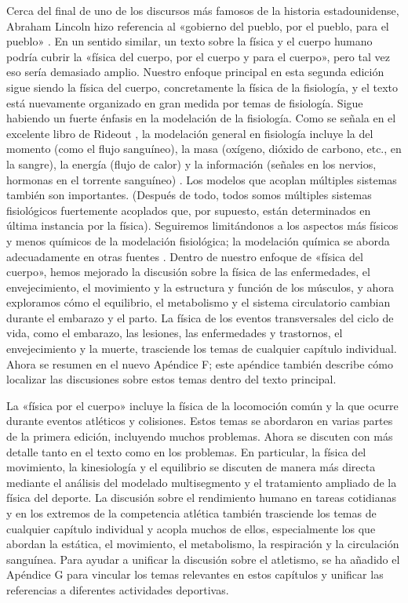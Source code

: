﻿\documentclass{book}
\begin{document}
Cerca del final de uno de los discursos más famosos de la historia estadounidense, Abraham Lincoln hizo referencia al «gobierno del pueblo, por el pueblo, para el pueblo» \cite{2nd-5}. En un sentido similar, un texto sobre la física y el cuerpo humano podría cubrir la «física del cuerpo, por el cuerpo y para el cuerpo», pero tal vez eso sería demasiado amplio. Nuestro enfoque principal en esta segunda edición sigue siendo la física del cuerpo, concretamente la física de la fisiología, y el texto está nuevamente organizado en gran medida por temas de fisiología. Sigue habiendo un fuerte énfasis en la modelación de la fisiología. Como se señala en el excelente libro de Rideout \cite{2nd-7}, la modelación general en fisiología incluye la del momento (como el flujo sanguíneo), la masa (oxígeno, dióxido de carbono, etc., en la sangre), la energía (flujo de calor) y la información (señales en los nervios, hormonas en el torrente sanguíneo) \cite{2nd-7}. Los modelos que acoplan múltiples sistemas también son importantes. (Después de todo, todos somos múltiples sistemas fisiológicos fuertemente acoplados que, por supuesto, están determinados en última instancia por la física). Seguiremos limitándonos a los aspectos más físicos y menos químicos de la modelación fisiológica; la modelación química se aborda adecuadamente en otras fuentes \cite{2nd-1, 2nd-2, 2nd-3, 2nd-4, 2nd-6, 2nd-7}. Dentro de nuestro enfoque de «física del cuerpo», hemos mejorado la discusión sobre la física de las enfermedades, el envejecimiento, el movimiento y la estructura y función de los músculos, y ahora exploramos cómo el equilibrio, el metabolismo y el sistema circulatorio cambian durante el embarazo y el parto. La física de los eventos transversales del ciclo de vida, como el embarazo, las lesiones, las enfermedades y trastornos, el envejecimiento y la muerte, trasciende los temas de cualquier capítulo individual. Ahora se resumen en el nuevo Apéndice F; este apéndice también describe cómo localizar las discusiones sobre estos temas dentro del texto principal.

La «física por el cuerpo» incluye la física de la locomoción común y la que ocurre durante eventos atléticos y colisiones. Estos temas se abordaron en varias partes de la primera edición, incluyendo muchos problemas. Ahora se discuten con más detalle tanto en el texto como en los problemas. En particular, la física del movimiento, la kinesiología y el equilibrio \cite{2nd-8} se discuten de manera más directa mediante el análisis del modelado multisegmento y el tratamiento ampliado de la física del deporte. La discusión sobre el rendimiento humano en tareas cotidianas y en los extremos de la competencia atlética también trasciende los temas de cualquier capítulo individual y acopla muchos de ellos, especialmente los que abordan la estática, el movimiento, el metabolismo, la respiración y la circulación sanguínea. Para ayudar a unificar la discusión sobre el atletismo, se ha añadido el Apéndice G para vincular los temas relevantes en estos capítulos y unificar las referencias a diferentes actividades deportivas.
\end{document}
